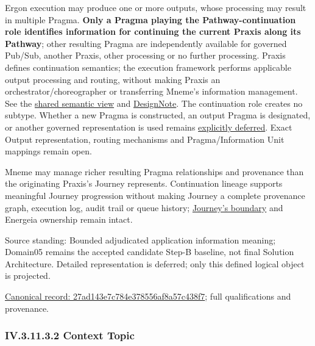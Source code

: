 Ergon execution may produce one or more outputs, whose processing may result in
multiple Pragma. \textbf{Only a Pragma playing the Pathway-continuation role identifies
information for continuing the current Praxis along its Pathway}; other resulting
Pragma are independently available for governed Pub/Sub, another Praxis, other
processing or no further processing. Praxis defines continuation semantics;
the execution framework performs applicable output processing and routing,
without making Praxis an orchestrator/choreographer or transferring Mneme's
information management. See the \hyperref[element:27ad143e7c784e378556af8a57c438f7]{shared semantic view}
and \href{\detokenize{../../../../../../../../docs/markdown/05-information-systems-architecture/design-notes/DesignNote-Pragma-Outputs-and-Pathway-Continuation.md}}{DesignNote}.
The continuation role creates no subtype. Whether a new Pragma is constructed,
an output Pragma is designated, or another governed representation is used remains
\href{\detokenize{../../../../../../../../docs/markdown/05-information-systems-architecture/gaps.md#continuation-representation}}{explicitly deferred}. Exact Output
representation, routing mechanisms and Pragma/Information Unit mappings remain open.



Mneme may manage richer resulting Pragma relationships and provenance than the
originating Praxis's Journey represents. Continuation lineage supports meaningful
Journey progression without making Journey a complete provenance graph, execution
log, audit trail or queue history; \hyperref[element:359b901df27f4b43b5a2ff14a8484e34]{Journey's boundary}
and Energeia ownership remain intact.



Source standing: Bounded adjudicated application information meaning; Domain05 remains the accepted candidate Step-B baseline, not final Solution Architecture. Detailed representation is deferred; only this defined logical object is projected.


{\footnotesize \href{../../../../../../../continuum/application/data-object/27ad143e7c784e378556af8a57c438f7.md}{Canonical record: 27ad143e7c784e378556af8a57c438f7}; full qualifications and provenance.}\par
\subsubsection*{IV.3.11.3.2 Context Topic}
\label{navigation:IV.3.11.3.2}

